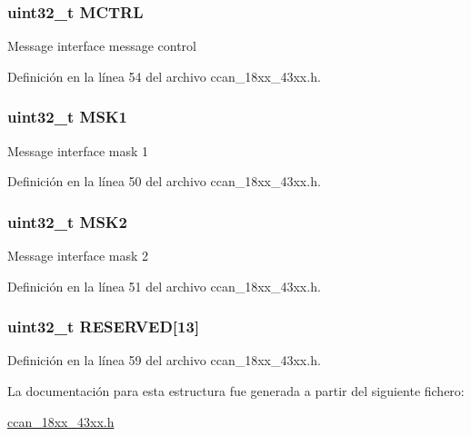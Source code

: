 \subsubsection[{\texorpdfstring{M\+C\+T\+RL}{MCTRL}}]{ uint32\+\_\+t M\+C\+T\+RL}\hypertarget{struct_c_c_a_n___i_f___t_a6f1d320c5d95a0c288d463dd2b12bca4}{}\label{struct_c_c_a_n___i_f___t_a6f1d320c5d95a0c288d463dd2b12bca4}
Message interface message control 

Definición en la línea 54 del archivo ccan\+\_\+18xx\+\_\+43xx.\+h.

\subsubsection[{\texorpdfstring{M\+S\+K1}{MSK1}}]{ uint32\+\_\+t M\+S\+K1}\hypertarget{struct_c_c_a_n___i_f___t_afd1b3d12f18670bb9595536434e69d89}{}\label{struct_c_c_a_n___i_f___t_afd1b3d12f18670bb9595536434e69d89}
Message interface mask 1 

Definición en la línea 50 del archivo ccan\+\_\+18xx\+\_\+43xx.\+h.

\subsubsection[{\texorpdfstring{M\+S\+K2}{MSK2}}]{ uint32\+\_\+t M\+S\+K2}\hypertarget{struct_c_c_a_n___i_f___t_ab6dd6d6d5b2220dfe7165d0a672d507b}{}\label{struct_c_c_a_n___i_f___t_ab6dd6d6d5b2220dfe7165d0a672d507b}
Message interface mask 2 

Definición en la línea 51 del archivo ccan\+\_\+18xx\+\_\+43xx.\+h.

\subsubsection[{\texorpdfstring{R\+E\+S\+E\+R\+V\+ED}{RESERVED}}]{ uint32\+\_\+t R\+E\+S\+E\+R\+V\+ED\mbox{[}13\mbox{]}}\hypertarget{struct_c_c_a_n___i_f___t_aab95e449201210100f518b9d5d6fe52f}{}\label{struct_c_c_a_n___i_f___t_aab95e449201210100f518b9d5d6fe52f}


Definición en la línea 59 del archivo ccan\+\_\+18xx\+\_\+43xx.\+h.



La documentación para esta estructura fue generada a partir del siguiente fichero\+:\begin{DoxyCompactItemize}
\item 
\hyperlink{ccan__18xx__43xx_8h}{ccan\+\_\+18xx\+\_\+43xx.\+h}\end{DoxyCompactItemize}
